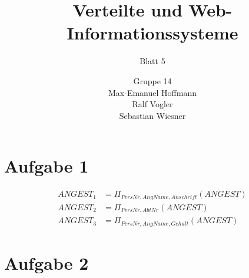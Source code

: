 \documentclass[11pt,a4paper]{scrartcl}
\begin{document}
\author{Gruppe 14\\Max-Emanuel Hoffmann\\Ralf Vogler\\Sebastian Wiesner}
\title{Verteilte und Web-Informationssysteme}
\subtitle{Blatt 5}

\maketitle

\section*{Aufgabe 1}

\begin{align*}
  ANGEST_1 &= \Pi_{PersNr,AngName,Anschrift}(ANGEST) \\
  ANGEST_2 &= \Pi_{PersNr,AbtNr}(ANGEST) \\
ANGEST_3 &= \Pi_{PersNr,AngName,Gehalt}(ANGEST)
\end{align*}

\section*{Aufgabe 2}
\end{document}
